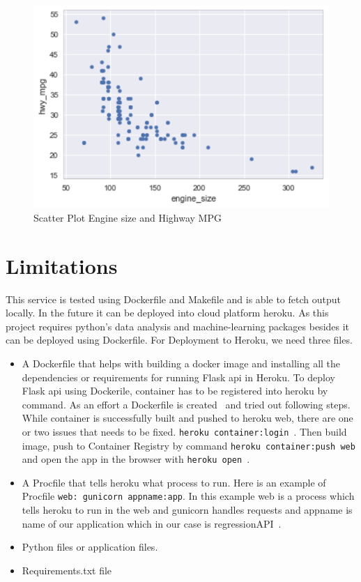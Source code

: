   \begin{figure}[h!]
  \includegraphics[scale=1.0]{images/scatterplot.pdf}
  \caption{Scatter Plot Engine size and Highway MPG}
\label{fig:scatterplt}
\end{figure} 
 
\section{Limitations} 

This service is tested using Dockerfile and Makefile and is able to fetch
output locally. In the future it can be deployed into cloud platform heroku.
As this project requires python's data analysis and machine-learning packages 
besides it can be deployed using Dockerfile. For Deployment to Heroku, we need 
three files.
\begin{itemize}
 \item A Dockerfile that helps with building a docker image and installing 
 all the dependencies or requirements for running Flask api in Heroku.
 To deploy Flask api using Dockerile, container has to be registered into 
 heroku by command. As an effort a Dockerfile is 
 created~\cite{hid-sp18-415-dockerfile} and tried out 
 following steps. While container is successfully built and pushed to heroku 
 web, there are one or two 
 issues that needs to be fixed.
 \verb|heroku container:login|~\cite{hid-sp18-415-heroku-com}. 
 Then build image, push to Container Registry by command 
 \verb|heroku container:push web| and open the app in the browser with
 \verb|heroku open|~\cite{hid-sp18-415-heroku-com}.
 
 \item A Procfile that tells heroku what process to run. Here is an example 
 of Procfile \verb|web: gunicorn appname:app|. In this example web is a 
 process which tells heroku to run in the web and gunicorn handles requests
 and appname is name of our application which in our case is 
 regressionAPI~\cite{hid-sp18-415-regressionapi}.
 \item Python files or application files.
 \item Requirements.txt file
 
 \end{itemize}

